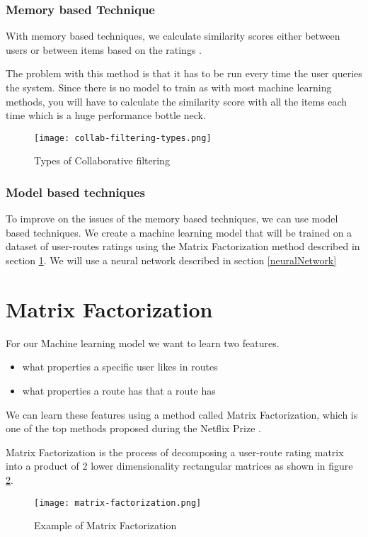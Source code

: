 \subsubsection{Memory based Technique}
With memory based techniques, we calculate similarity scores either between users or between items based on the ratings \cite{wang2006unifying}. 

The problem with this method is that it has to be run every time the user queries the system. Since there is no model to train as with most machine learning methods, you will have to calculate the similarity score with all the items each time which is a huge performance bottle neck.
\begin{figure}[ht]
    \centering
    \texttt{[image: collab-filtering-types.png]}
    \caption{Types of Collaborative filtering}
    \label{fig:collabFilteringTypes}
\end{figure}

\subsubsection{Model based techniques}
To improve on the issues of the memory based techniques, we can use model based techniques. We create a machine learning model that will be trained on a dataset of user-routes ratings using the Matrix Factorization method described in section \ref{matrixFactorization}. We will use a neural network described in section \ref{neuralNetwork}
\section{Matrix Factorization} \label{matrixFactorization}
For our Machine learning model we want to learn two features. 
\begin{itemize}
    \item what properties a specific user likes in routes
    \item what properties a route has that a route has
\end{itemize}
We can learn these features using a method called Matrix Factorization, which is one of the top methods proposed during the Netflix Prize \cite{bell2007lessons}.

Matrix Factorization is the process of decomposing a user-route rating matrix into a product of 2 lower dimensionality rectangular matrices \cite{koren2009bellkor} as shown in figure \ref{fig:matrixFactorization}.

\begin{figure}[ht]
    \centering
    \texttt{[image: matrix-factorization.png]}
    \caption{Example of Matrix Factorization}
    \label{fig:matrixFactorization}
\end{figure}


